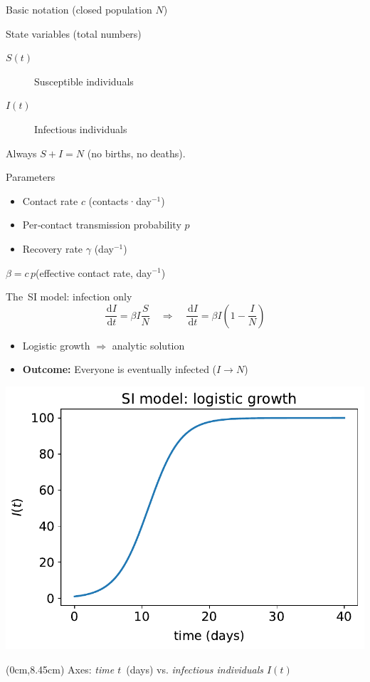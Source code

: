 \documentclass[14pt,aspectratio=169]{beamer}
\newcommand{\dd}{\,\mathrm{d}}
\begin{document}
\begin{frame}{Basic notation (closed population $N$)}
  \begin{block}{State variables (total numbers)}
    \begin{description}
      \item[$S(t)$] Susceptible individuals
      \item[$I(t)$] Infectious individuals
    \end{description}
    Always $S+I=N$ (no births, no deaths).
  \end{block}
  \vspace{0.5em}
  \begin{block}{Parameters}
    \begin{itemize}
      \item Contact rate $c$ (contacts·day$^{-1}$)
      \item Per‑contact transmission probability $p$
      \item Recovery rate $\gamma$ (day$^{-1}$)
    \end{itemize}
    \vspace{0.3em}
    \alert{$\beta = c\,p$}\hfill(effective contact rate, day$^{-1}$)
  \end{block}
\end{frame}

\begin{frame}{The SI model: infection only}
  \[
    \frac{\dd I}{\dd t}=\beta I\frac{S}{N}
    \quad\Longrightarrow\quad
    \frac{\dd I}{\dd t}=\beta I\!\left(1-\frac{I}{N}\right)
  \]
  \begin{itemize}
    \item Logistic growth $\Rightarrow$ analytic solution
    \item \textbf{Outcome:} Everyone is eventually infected ($I\to N$)
  \end{itemize}
  \centering
  \includegraphics{LogisticIllustration.pdf}
  \begin{textblock*}{\textwidth}(0cm,8.45cm)
    {\scriptsize Axes: \emph{time $t$} (days) vs. \emph{infectious individuals $I(t)$}}
  \end{textblock*}
\end{frame}
\end{document}
